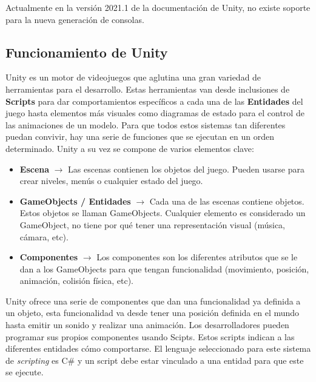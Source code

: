 Actualmente en la versi\'on 2021.1 de la documentaci\'on de Unity, no existe soporte para la nueva generaci\'on de consolas.\\


\subsection {Funcionamiento de Unity}

Unity es un motor de videojuegos que aglutina una gran variedad de herramientas para el desarrollo. Estas herramientas van desde inclusiones de \textbf{Scripts} para dar comportamientos espec\'ificos a cada una de las \textbf{Entidades} del juego hasta elementos m\'as visuales como diagramas de estado para el control de las animaciones de un modelo. Para que todos estos sistemas tan diferentes puedan convivir, hay una serie de funciones que se ejecutan en un orden determinado. Unity a su vez se compone de varios elementos clave:\\

\begin {itemize}
\item \textbf{Escena} $\rightarrow$  Las escenas contienen los objetos del juego. Pueden usarse para crear niveles, men\'us o cualquier estado del juego.
\item \textbf{GameObjects / Entidades} $\rightarrow$ Cada una de las escenas contiene objetos. Estos objetos se llaman GameObjects. Cualquier elemento es considerado un GameObject, no tiene por qu\'e tener una representaci\'on visual (m\'usica, c\'amara, etc).
\item \textbf{Componentes} $\rightarrow$ Los componentes son los diferentes atributos que se le dan a los GameObjects para que tengan funcionalidad (movimiento, posici\'on, animaci\'on, colisi\'on f\'isica, etc).
\end {itemize}

Unity ofrece una serie de componentes que dan una funcionalidad ya definida a un objeto, esta funcionalidad va desde tener una posici\'on definida en el mundo hasta emitir un sonido y realizar una animaci\'on. Los desarrolladores pueden programar sus propios componentes usando Scipts. Estos scripts indican a las diferentes entidades c\'omo comportarse. El lenguaje seleccionado para este sistema de \textit{scripting} es C\# y un script debe estar vinculado a una entidad para que este se ejecute. \\


